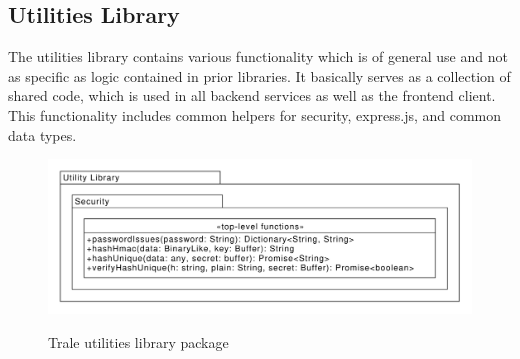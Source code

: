 \subsection{Utilities Library}\label{subsec:utilities-library}

The utilities library contains various functionality which is of general use and not as specific as logic contained in
prior libraries.
It basically serves as a collection of shared code, which is used in all backend services as well as the frontend
client.
This functionality includes common helpers for security, express.js, and common data types.

\begin{figure}[H]
    \centering
    \caption{Trale utilities library package}
    \includegraphics[width=1\textwidth]{./graphics/classDiagramUtilitiesLibrary}
    \label{fig:figure39}
\end{figure}
